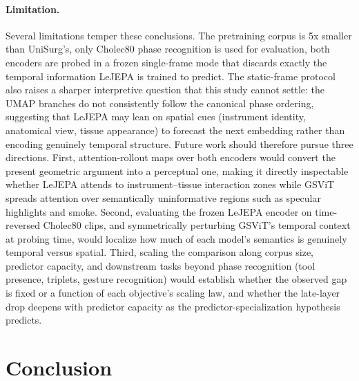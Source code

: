 \documentclass[11pt, a4paper]{article}
\begin{document}
\paragraph{Limitation.} Several limitations temper these conclusions. The pretraining corpus is 5x smaller than UniSurg's, only Cholec80 phase recognition is used for evaluation, both encoders are probed in a frozen single-frame mode that discards exactly the temporal information LeJEPA is trained to predict. The static-frame protocol also raises a sharper interpretive question that this study cannot settle: the UMAP branches do not consistently follow the canonical phase ordering, suggesting that LeJEPA may lean on spatial cues (instrument identity, anatomical view, tissue appearance) to forecast the next embedding rather than encoding genuinely temporal structure. Future work should therefore pursue three directions. First, attention-rollout maps over both encoders would convert the present geometric argument into a perceptual one, making it directly inspectable whether LeJEPA attends to instrument--tissue interaction zones while GSViT spreads attention over semantically uninformative regions such as specular highlights and smoke. Second, evaluating the frozen LeJEPA encoder on time-reversed Cholec80 clips, and symmetrically perturbing GSViT's temporal context at probing time, would localize how much of each model's semantics is genuinely temporal versus spatial. Third, scaling the comparison along corpus size, predictor capacity, and downstream tasks beyond phase recognition (tool presence, triplets, gesture recognition) would establish whether the observed gap is fixed or a function of each objective's scaling law, and whether the late-layer drop deepens with predictor capacity as the predictor-specialization hypothesis predicts.
\section{Conclusion}
\end{document}
